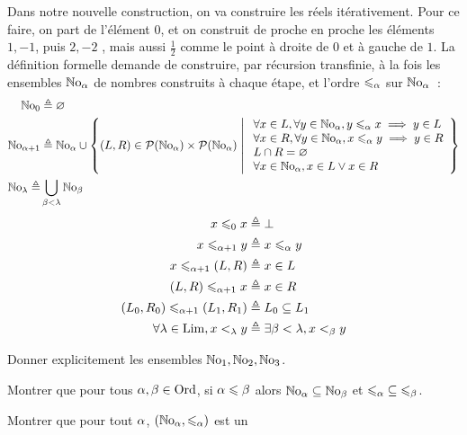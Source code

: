 \begin{problem}
  Dans notre nouvelle construction, on va construire les réels itérativement.
  Pour ce faire, on part de l'élément $0$, et on construit de proche en proche
  les éléments $1,-1$, puis $2,-2$ , mais aussi
  $\frac{1}{2}$ comme le point à droite de $0$ et à gauche de $1$. La définition
  formelle demande de construire, par récursion transfinie, à la fois les
  ensembles $\mathbb{N}\mathrm{o}_{\alpha}$ de nombres construits à chaque étape, et l'ordre
  $\leqslant_{\alpha}$ sur $\mathbb{N}\mathrm{o}_{\alpha}$~:
  \begin{align*}
  \mathbb{N}\mathrm{o}_0 &\triangleq \varnothing\\
  \mathbb{N}\mathrm{o}_{\alpha+1} &\triangleq \mathbb{N}\mathrm{o}_{\alpha}\cup
  \left\{ (L,R) \in \mathcal{P}(\mathbb{N}\mathrm{o}_{\alpha})\times\mathcal{P}(\mathbb{N}\mathrm{o}_{\alpha}) \;\middle\vert\; \begin{array}{l}
            \forall x \in L, \forall y \in \mathbb{N}\mathrm{o}_{\alpha}, y \leqslant_{\alpha} x
            \implies y \in L\\
            \forall x \in R, \forall y \in \mathbb{N}\mathrm{o}_{\alpha}, x \leqslant_{\alpha} y
            \implies y \in R\\
            L\cap R = \varnothing\\
            \forall x \in \mathbb{N}\mathrm{o}_{\alpha}, x \in L \lor x \in R
        \end{array} \right\}\\
  \mathbb{N}\mathrm{o}_{\lambda} \triangleq& \bigcup_{\beta < \lambda} \mathbb{N}\mathrm{o}_{\beta}
  \end{align*}
  \begin{align*}
  x \leqslant_0 x &\triangleq \bot\\
  x \leqslant_{\alpha+1} y &\triangleq x \leqslant_{\alpha} y\\
  x \leqslant_{\alpha+1} (L,R) &\triangleq x \in L\\
  (L,R) \leqslant_{\alpha+1} x &\triangleq x \in R\\
  (L_0,R_0) \leqslant_{\alpha+1} (L_1,R_1) &\triangleq L_0\subseteq L_1\\
  \forall \lambda\in\operatorname{Lim}, x <_{\lambda} y &\triangleq
  \exists \beta < \lambda, x <_{\beta} y
  \end{align*}
  \begin{pbQuest}
  \item Donner explicitement les ensembles $\mathbb{N}\mathrm{o}_1,\mathbb{N}\mathrm{o}_2,\mathbb{N}\mathrm{o}_3$.
  \item Montrer que pour tous $\alpha,\beta \in \operatorname{Ord}$, si
    $\alpha \leqslant \beta$ alors $\mathbb{N}\mathrm{o}_{\alpha}\subseteq \mathbb{N}\mathrm{o}_{\beta}$ et
    $\mathord{\leqslant_{\alpha}}\subseteq \mathord{\leqslant_{\beta}}$.
  \item Montrer que pour tout $\alpha$, $(\mathbb{N}\mathrm{o}_{\alpha},\leqslant_{\alpha})$ est un

\end{pbQuest}
\end{problem}
